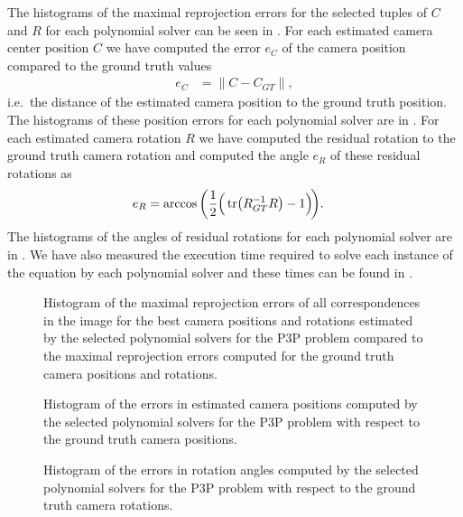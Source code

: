 The histograms of the maximal reprojection errors for the selected tuples of $C$ and $R$ for each polynomial solver can be seen in .
For each estimated camera center position $C$ we have computed the error $e_C$ of the camera position compared to the ground truth values
\begin{align}
  e_C &= \|C-C_{GT}\|,
\end{align}
i.e.\ the distance of the estimated camera position to the ground truth position.
The histograms of these position errors for each polynomial solver are in .
For each estimated camera rotation $R$ we have computed the residual rotation to the ground truth camera rotation and computed the angle $e_R$ of these residual rotations as
\begin{align}
  e_R &= \arccos\bigg(\frac{1}{2}\Big(\operatorname{tr}\!\big(R_{GT}^{-1}R\big)-1\Big)\!\bigg).
\end{align}
The histograms of the angles of residual rotations for each polynomial solver are in .
We have also measured the execution time required to solve each instance of the equation  by each polynomial solver and these times can be found in .

\begin{figure}[ht]
  \centering
  \resizebox{0.95\textwidth}{!}{}
  \caption{Histogram of the maximal reprojection errors of all correspondences in the image for the best camera positions and rotations estimated by the selected polynomial solvers for the P3P problem compared to the maximal reprojection errors computed for the ground truth camera positions and rotations.}
\end{figure}

\begin{figure}[ht]
  \centering
  \resizebox{0.95\textwidth}{!}{}
  \caption{Histogram of the errors in estimated camera positions computed by the selected polynomial solvers for the P3P problem with respect to the ground truth camera positions.}
\end{figure}

\begin{figure}[ht]
  \centering
  \resizebox{0.95\textwidth}{!}{}
  \caption{Histogram of the errors in rotation angles computed by the selected polynomial solvers for the P3P problem with respect to the ground truth camera rotations.}
\end{figure}

